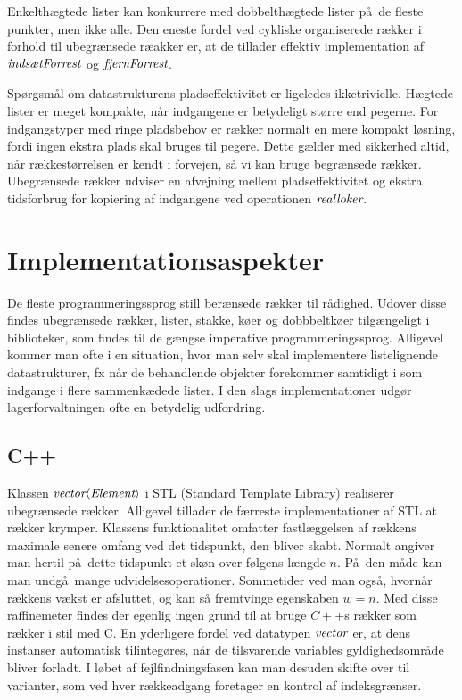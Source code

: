 Enkelthægtede lister kan konkurrere med dobbelthægtede lister på de fleste punkter, men ikke alle.
Den eneste fordel ved cykliske organiserede rækker i forhold til ubegrænsede ræakker er, at de tillader effektiv implementation af $\operatorname{\emph{indsætForrest}}$ og $\operatorname{\emph{fjernForrest}}$.

Spørgsmål om datastrukturens pladseffektivitet er ligeledes ikketrivielle.
Hægtede lister er meget kompakte, når indgangene er betydeligt større end pegerne.
For indgangstyper med ringe pladsbehov er rækker normalt en mere kompakt løsning, fordi ingen ekstra plads skal bruges til pegere.
Dette gælder med sikkerhed altid, når rækkestørrelsen er kendt i forvejen, så vi kan bruge begrænsede rækker.
Ubegrænsede rækker udviser en afvejning mellem pladseffektivitet og ekstra tidsforbrug for kopiering af indgangene ved operationen $\operatorname{\emph{realloker}}$. 


\section{Implementationsaspekter}

De fleste programmeringssprog still berænsede rækker til rådighed.
Udover disse findes ubegrænsede rækker, lister, stakke, køer og dobbbeltkøer tilgængeligt i biblioteker, som findes til de gængse imperative programmeringssprog.
Alligevel kommer man ofte i en situation, hvor man selv skal implementere listelignende datastrukturer, fx når de behandlende objekter forekommer samtidigt i som indgange i flere sammenkædede lister.
I den slags implementationer udgør lagerforvaltningen ofte en betydelig udfordring.

\subsection{C++}

Klassen $\operatorname{\emph{vector}}\langle\operatorname{\emph{Element}}\rangle$ i STL (Standard Template Library) realiserer ubegrænsede rækker.
Alligevel tillader de færreste implementationer af STL at rækker krymper.
Klassens funktionalitet omfatter fastlæggelsen af rækkens maximale senere omfang ved det tidspunkt, den bliver skabt.
Normalt angiver man hertil på dette tidspunkt et skøn over følgens længde $n$.
På den måde kan man undgå mange udvidelsesoperationer.
Sommetider ved man også, hvornår rækkens vækst er afsluttet, og kan så fremtvinge egenskaben $w=n$.
Med disse raffinemeter findes der egenlig ingen grund til at bruge $C++$s rækker som rækker i stil med C.
En yderligere fordel ved datatypen $\operatorname{\emph{vector}}$ er, at dens instanser automatisk tilintegøres, når de tilsvarende variables gyldighedsområde bliver forladt.
I løbet af fejlfindningsfasen kan man desuden skifte over til varianter, som ved hver rækkeadgang foretager en kontrol af indeksgrænser.

